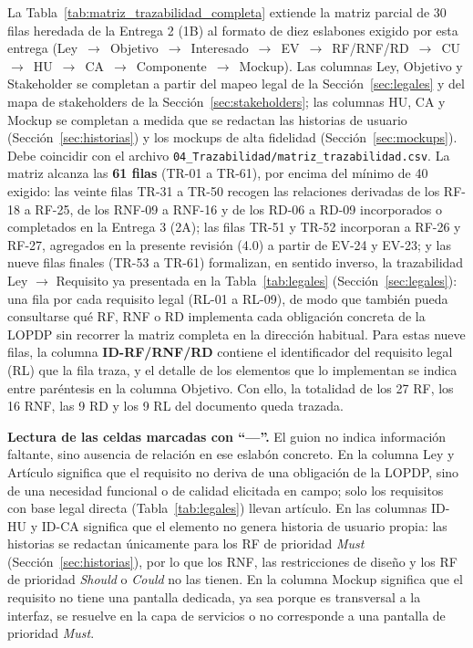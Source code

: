\documentclass[journal,onecolumn]{IEEEtran}
\begin{document}
	La Tabla~\ref{tab:matriz_trazabilidad_completa} extiende la matriz parcial de
	30 filas heredada de la Entrega 2 (1B) al formato de diez eslabones exigido
	por esta entrega (Ley~$\rightarrow$~Objetivo~$\rightarrow$~Interesado~$\rightarrow$~EV~$\rightarrow$~RF/RNF/RD~$\rightarrow$~CU~$\rightarrow$~HU~$\rightarrow$~CA~$\rightarrow$~Componente~$\rightarrow$~Mockup).
	Las columnas Ley, Objetivo y Stakeholder se completan a partir del mapeo legal
	de la Sección~\ref{sec:legales} y del mapa de stakeholders de la
	Sección~\ref{sec:stakeholders}; las columnas HU, CA y Mockup se completan a
	medida que se redactan las historias de usuario (Sección~\ref{sec:historias})
	y los mockups de alta fidelidad (Sección~\ref{sec:mockups}). Debe coincidir
	con el archivo \texttt{04\_Trazabilidad/matriz\_trazabilidad.csv}. La matriz
	alcanza las \textbf{61 filas} (TR-01 a TR-61), por encima del mínimo de 40
	exigido: las veinte filas TR-31 a TR-50 recogen las relaciones derivadas de
	los RF-18 a RF-25, de los RNF-09 a RNF-16 y de los RD-06 a RD-09
	incorporados o completados en la Entrega 3 (2A); las filas TR-51 y TR-52
	incorporan a RF-26 y RF-27, agregados en la presente revisión (4.0) a
	partir de EV-24 y EV-23; y las nueve filas finales (TR-53 a TR-61)
	formalizan, en sentido inverso, la trazabilidad Ley $\rightarrow$ Requisito
	ya presentada en la Tabla~\ref{tab:legales} (Sección~\ref{sec:legales}): una
	fila por cada requisito legal (RL-01 a RL-09), de modo que también pueda
	consultarse qué RF, RNF o RD implementa cada obligación concreta de la
	LOPDP sin recorrer la matriz completa en la dirección habitual. Para estas
	nueve filas, la columna \textbf{ID-RF/RNF/RD} contiene el identificador del
	requisito legal (RL) que la fila traza, y el detalle de los elementos que lo
	implementan se indica entre paréntesis en la columna Objetivo. Con ello, la
	totalidad de los 27 RF, los 16 RNF, las 9 RD y los 9 RL del documento queda
	trazada.
	
	\textbf{Lectura de las celdas marcadas con \enquote{---}.} El guion no indica
	información faltante, sino ausencia de relación en ese eslabón concreto. En la
	columna Ley y Artículo significa que el requisito no deriva de una obligación
	de la LOPDP, sino de una necesidad funcional o de calidad elicitada en campo;
	solo los requisitos con base legal directa (Tabla~\ref{tab:legales}) llevan
	artículo. En las columnas ID-HU y ID-CA significa que el elemento no genera
	historia de usuario propia: las historias se redactan únicamente para los RF
	de prioridad \emph{Must} (Sección~\ref{sec:historias}), por lo que los RNF,
	las restricciones de diseño y los RF de prioridad \emph{Should} o
	\emph{Could} no las tienen. En la columna Mockup significa que el requisito no
	tiene una pantalla dedicada, ya sea porque es transversal a la interfaz, se
	resuelve en la capa de servicios o no corresponde a una pantalla de prioridad
	\emph{Must}.
	
\end{document}

